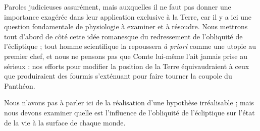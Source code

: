 \documentclass[a4paper, 11pt, oneside]{article}
\begin{document}
Paroles judicieuses assurément, mais auxquelles il ne faut pas donner une importance exagérée dans leur application exclusive à la Terre, car il y a ici une question fondamentale de physiologie à examiner et à résoudre. Nous mettrons tout d'abord de côté cette idée romanesque du redressement de l'obliquité de l'écliptique ; tout homme scientifique la repoussera \emph{à priori} comme une utopie au premier chef, et nous ne pensons pas que Comte lui-même l'ait jamais prise au sérieux : nos efforts pour modifier la position de la Terre équivaudraient à ceux que produiraient des fourmis s'exténuant pour faire tourner la coupole du Panthéon.

Nous n'avons pas à parler ici de la réalisation d'une hypothèse irréalisable ; mais nous devons examiner quelle est l'influence de l'obliquité de l'écliptique sur l'état de la vie à la surface de chaque monde.
\end{document}
